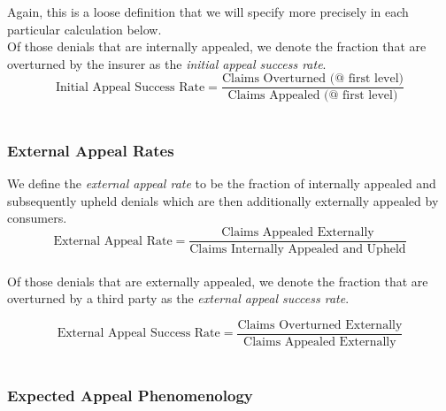 \documentclass[psamsfonts]{amsart}
\theoremstyle{plain}
\theoremstyle{definition}
\theoremstyle{remark}
\begin{document}
Again, this is a loose definition that we will specify more precisely in each particular calculation below.\\

Of those denials that are internally appealed, we denote the fraction that are overturned by the insurer as the \emph{initial appeal success rate}.\\
	
\begin{equation*}
	\text{Initial Appeal Success Rate} = \dfrac{\text{Claims Overturned (@ first level)}}{\text{Claims Appealed (@ first level)}}
\end{equation*}
\hfill\\
	

\subsubsection{External Appeal Rates}

We define the \emph{external appeal rate} to be the fraction of internally appealed and subsequently upheld denials which are then additionally externally appealed by consumers.\\

\begin{equation*}
	\text{External Appeal Rate} = \dfrac{\text{Claims Appealed Externally}}{\text{Claims Internally Appealed and Upheld}}
\end{equation*}
\hfill\\


Of those denials that are externally appealed, we denote the fraction that are overturned by a third party as the \emph{external appeal success rate}.

\begin{equation*}
	\text{External Appeal Success Rate} = \dfrac{\text{Claims Overturned Externally}}{\text{Claims Appealed Externally}}
\end{equation*}
\hfill\\


\subsubsection{Expected Appeal Phenomenology}
\end{document}

